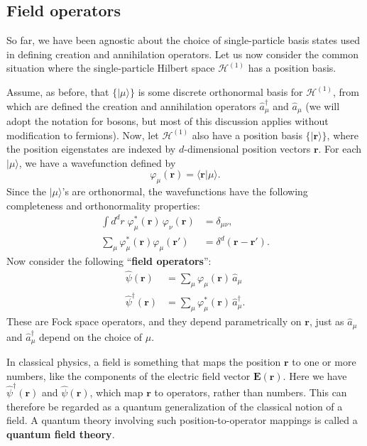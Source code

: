 \documentclass[prx,12pt]{revtex4-2}
\begin{document}
\subsection{Field operators}

So far, we have been agnostic about the choice of single-particle
basis states used in defining creation and annihilation operators.
Let us now consider the common situation where the single-particle
Hilbert space $\mathscr{H}^{(1)}$ has a position basis.

Assume, as before, that $\{|\mu\rangle\}$ is some discrete orthonormal
basis for $\mathscr{H}^{(1)}$, from which are defined the creation and
annihilation operators $\hat{a}_\mu^\dagger$ and $\hat{a}_\mu$ (we
will adopt the notation for bosons, but most of this discussion
applies without modification to fermions).  Now, let
$\mathscr{H}^{(1)}$ also have a position basis
$\{|\mathbf{r}\rangle\}$, where the position eigenstates are indexed
by $d$-dimensional position vectors $\mathbf{r}$.  For each
$|\mu\rangle$, we have a wavefunction defined by
\begin{equation}
  \varphi_\mu(\mathbf{r}) = \langle\mathbf{r}|\mu\rangle.
\end{equation}
Since the $|\mu\rangle$'s are orthonormal, the wavefunctions have the
following completeness and orthonormality properties:
\begin{align}
  \int d^dr \; \varphi_\mu^*(\mathbf{r})\, \varphi_\nu(\mathbf{r}) &= \delta_{\mu\nu}, \label{wfn1} \\
  \sum_\mu \varphi_\mu^*(\mathbf{r}) \varphi_\mu(\mathbf{r}') &=
  \delta^d(\mathbf{r}-\mathbf{r}').
  \label{wfn2}
\end{align}
Now consider the following ``\textbf{field operators}'':
\begin{align}
  \hat{\psi}(\mathbf{r}) &= \sum_\mu \varphi_\mu(\mathbf{r}) \, \hat{a}_\mu
  \label{psir1} \\
  \hat{\psi}^\dagger(\mathbf{r}) &= \sum_\mu \varphi_\mu^*(\mathbf{r}) \, \hat{a}_\mu^\dagger.
  \label{psir2}
\end{align}
These are Fock space operators, and they depend parametrically on
$\mathbf{r}$, just as $\hat{a}_\mu$ and $\hat{a}_\mu^\dagger$ depend
on the choice of $\mu$.

In classical physics, a field is something that maps the position
$\mathbf{r}$ to one or more numbers, like the components of the
electric field vector $\mathbf{E}(\mathbf{r})$.  Here we have
$\hat{\psi}^\dagger(\mathbf{r})$ and $\hat{\psi}(\mathbf{r})$, which
map $\mathbf{r}$ to operators, rather than numbers.  This can
therefore be regarded as a quantum generalization of the classical
notion of a field.  A quantum theory involving such
position-to-operator mappings is called a \textbf{quantum field
  theory}.
\end{document}
